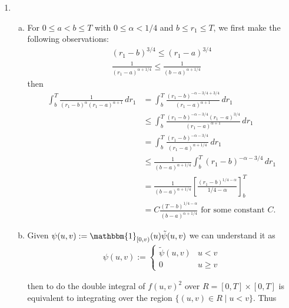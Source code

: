 \documentclass[a4paper,12pt]{article}
\theoremstyle{definition}
\begin{document}
\begin{enumerate}
\item
\begin{enumerate}[(a)]
\item For $0 \leq a < b \leq T$ with $0 \leq \alpha < 1/4$ and $b \leq r_1 \leq T$, we first make the following observations:
\begin{align}
(r_1-b)^{3/4} \leq (r_1-a)^{3/4}\\
\frac{1}{(r_1-a)^{\alpha+1/4}} \leq \frac{1}{(b-a)^{\alpha+1/4}}
\end{align}
then
\begin{align*}
\int_{b}^{T}\frac{1}{(r_1-b)^\alpha(r_1-a)^{\alpha+1}}\,dr_1 &= \int_{b}^{T}\frac{(r_1-b)^{-\alpha-3/4+3/4}}{(r_1-a)^{\alpha+1}}\,dr_1\\
&\leq \int_{b}^{T}\frac{(r_1-b)^{-\alpha-3/4}(r_1-a)^{3/4}}{(r_1-a)^{\alpha+1}}\,dr_1\\
&= \int_{b}^{T}\frac{(r_1-b)^{-\alpha-3/4}}{(r_1-a)^{\alpha+1/4}}\,dr_1\\
&\leq \frac{1}{(b-a)^{\alpha+1/4}}\int_{b}^{T}(r_1-b)^{-\alpha-3/4}\,dr_1\\
&= \frac{1}{(b-a)^{\alpha+1/4}}\left[\frac{(r_1-b)^{1/4-\alpha}}{1/4-\alpha}\right]_{b}^{T}\\
&= C\frac{(T-b)^{1/4-\alpha}}{(b-a)^{\alpha+1/4}} \text{ for some constant $C$.}
\end{align*}


\item 
Given $\psi(u,v):= \mathbbm{1}_{[0,v)}(u)\tilde{\psi}(u,v)$ we can understand it as
\begin{align*}
\psi(u,v):=\begin{cases}
\tilde{\psi}(u,v) & u <v\\
0 & u \geq v
\end{cases}
\end{align*}

then to do the double integral of $f(u,v)^2$ over $R = [0,T] \times [0,T]$ is equivalent to integrating over the region $\{(u,v) \in R\mid u < v\}$. Thus 


\end{enumerate}
\end{enumerate}
\end{document}
